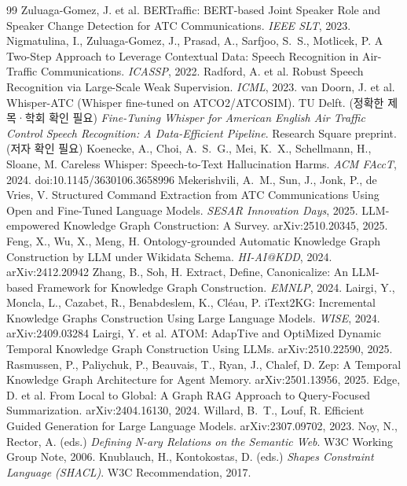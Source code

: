 \documentclass[10pt,a4paper]{article}
\begin{document}
\begin{thebibliography}{99}
 Zuluaga-Gomez, J. et al. BERTraffic: BERT-based Joint Speaker Role and Speaker Change Detection for ATC Communications. \emph{IEEE SLT}, 2023.
 Nigmatulina, I., Zuluaga-Gomez, J., Prasad, A., Sarfjoo, S.~S., Motlicek, P. A Two-Step Approach to Leverage Contextual Data: Speech Recognition in Air-Traffic Communications. \emph{ICASSP}, 2022.
 Radford, A. et al. Robust Speech Recognition via Large-Scale Weak Supervision. \emph{ICML}, 2023.
 van Doorn, J. et al. Whisper-ATC (Whisper fine-tuned on ATCO2/ATCOSIM). TU Delft. (정확한 제목·학회 확인 필요)
 \emph{Fine-Tuning Whisper for American English Air Traffic Control Speech Recognition: A Data-Efficient Pipeline}. Research Square preprint. (저자 확인 필요)
 Koenecke, A., Choi, A.~S.~G., Mei, K.~X., Schellmann, H., Sloane, M. Careless Whisper: Speech-to-Text Hallucination Harms. \emph{ACM FAccT}, 2024. doi:10.1145/3630106.3658996
 Mekerishvili, A.~M., Sun, J., Jonk, P., de Vries, V. Structured Command Extraction from ATC Communications Using Open and Fine-Tuned Language Models. \emph{SESAR Innovation Days}, 2025.
 LLM-empowered Knowledge Graph Construction: A Survey. arXiv:2510.20345, 2025.
 Feng, X., Wu, X., Meng, H. Ontology-grounded Automatic Knowledge Graph Construction by LLM under Wikidata Schema. \emph{HI-AI@KDD}, 2024. arXiv:2412.20942
 Zhang, B., Soh, H. Extract, Define, Canonicalize: An LLM-based Framework for Knowledge Graph Construction. \emph{EMNLP}, 2024.
 Lairgi, Y., Moncla, L., Cazabet, R., Benabdeslem, K., Cl\'eau, P. iText2KG: Incremental Knowledge Graphs Construction Using Large Language Models. \emph{WISE}, 2024. arXiv:2409.03284
 Lairgi, Y. et al. ATOM: AdapTive and OptiMized Dynamic Temporal Knowledge Graph Construction Using LLMs. arXiv:2510.22590, 2025.
 Rasmussen, P., Paliychuk, P., Beauvais, T., Ryan, J., Chalef, D. Zep: A Temporal Knowledge Graph Architecture for Agent Memory. arXiv:2501.13956, 2025.
 Edge, D. et al. From Local to Global: A Graph RAG Approach to Query-Focused Summarization. arXiv:2404.16130, 2024.
 Willard, B.~T., Louf, R. Efficient Guided Generation for Large Language Models. arXiv:2307.09702, 2023.
 Noy, N., Rector, A. (eds.) \emph{Defining N-ary Relations on the Semantic Web}. W3C Working Group Note, 2006.
 Knublauch, H., Kontokostas, D. (eds.) \emph{Shapes Constraint Language (SHACL)}. W3C Recommendation, 2017.

\end{thebibliography}
\end{document}
